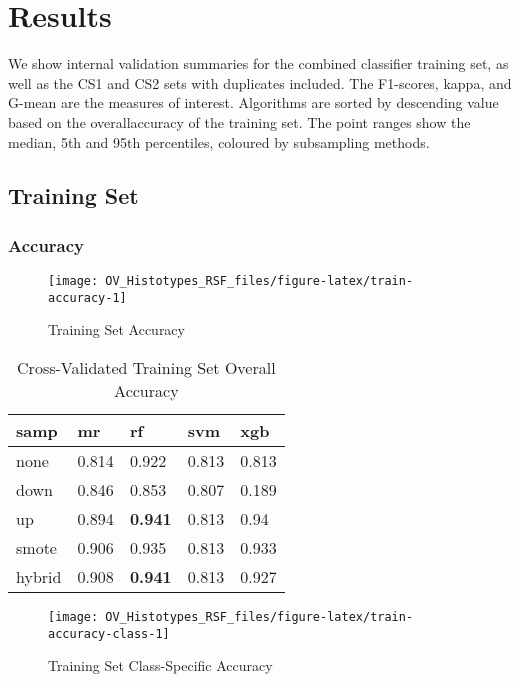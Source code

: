 \documentclass[
]{report}
\begin{document}
\hypertarget{results}{%
\chapter{Results}\label{results}}

We show internal validation summaries for the combined classifier training set, as well as the CS1 and CS2 sets with duplicates included. The F1-scores, kappa, and G-mean are the measures of interest. Algorithms are sorted by descending value based on the overallaccuracy of the training set. The point ranges show the median, 5th and 95th percentiles, coloured by subsampling methods.

\hypertarget{training-set}{%
\section{Training Set}\label{training-set}}

\hypertarget{accuracy}{%
\subsection{Accuracy}\label{accuracy}}

\begin{figure}[H]

{\centering \texttt{[image: OV\_Histotypes\_RSF\_files/figure-latex/train-accuracy-1]} 

}

\caption{Training Set Accuracy}\label{fig:train-accuracy}
\end{figure}

\begin{table}

\caption{\label{tab:train-accuracy-table}Cross-Validated Training Set Overall Accuracy}
\centering
\begin{tabular}[t]{l|l|l|l|l}
\hline
samp & mr & rf & svm & xgb\\
\hline
none & 0.814 & 0.922 & 0.813 & 0.813\\
\hline
down & 0.846 & 0.853 & 0.807 & 0.189\\
\hline
up & 0.894 & \textbf{0.941} & 0.813 & 0.94\\
\hline
smote & 0.906 & 0.935 & 0.813 & 0.933\\
\hline
hybrid & 0.908 & \textbf{0.941} & 0.813 & 0.927\\
\hline
\end{tabular}
\end{table}

\begin{figure}[H]

{\centering \texttt{[image: OV\_Histotypes\_RSF\_files/figure-latex/train-accuracy-class-1]} 

}

\caption{Training Set Class-Specific Accuracy}\label{fig:train-accuracy-class}
\end{figure}
\end{document}
